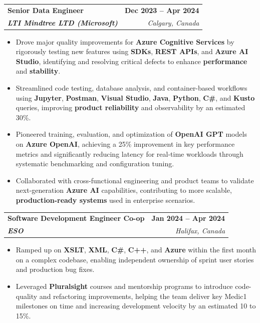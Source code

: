 \documentclass[letterpaper,11pt]{article}
\makeatletter
\newcommand{\resumeItem}[1]{
  \item\small{
    {#1 \vspace{-2pt}}
  }
}
\newcommand{\resumeSubheading}[4]{
  \vspace{-2pt}\item
    \begin{tabular*}{1.0\textwidth}[t]{l@{\extracolsep{\fill}}r}
      \textbf{#1} & \textbf{\small #2} \\
      \textit{\small#3} & \textit{\small #4} \\
    \end{tabular*}\vspace{-7pt}
}
\newcommand{\resumeItemListStart}{\begin{itemize}}
\newcommand{\resumeItemListEnd}{\end{itemize}\vspace{-5pt}}
\makeatother
\begin{document}
    \resumeSubheading
      {\textbf{Senior Data Engineer}}{\textbf{Dec 2023 -- Apr 2024}}
      {\textbf{LTI Mindtree LTD (Microsoft)}}{Calgary, Canada}
      \resumeItemListStart
        \resumeItem{Drove major quality improvements for \textbf{Azure Cognitive Services} by rigorously testing new features using \textbf{SDKs}, \textbf{REST APIs}, and \textbf{Azure AI Studio}, identifying and resolving critical defects to enhance \textbf{performance} and \textbf{stability}.}
        \resumeItem{Streamlined code testing, database analysis, and container-based workflows using \textbf{Jupyter}, \textbf{Postman}, \textbf{Visual Studio}, \textbf{Java}, \textbf{Python}, \textbf{C\#}, and \textbf{Kusto} queries, improving \textbf{product reliability} and observability by an estimated 30\%.}
        \resumeItem{Pioneered training, evaluation, and optimization of \textbf{OpenAI GPT} models on \textbf{Azure OpenAI}, achieving a 25\% improvement in key performance metrics and significantly reducing latency for real-time workloads through systematic benchmarking and configuration tuning.}
        \resumeItem{Collaborated with cross-functional engineering and product teams to validate next-generation \textbf{Azure AI} capabilities, contributing to more scalable, \textbf{production-ready systems} used in enterprise scenarios.}
      \resumeItemListEnd
    
    \resumeSubheading
      {\textbf{Software Development Engineer Co-op}}{\textbf{Jan 2024 -- Apr 2024}}
      {\textbf{ESO}}{Halifax, Canada}
      \resumeItemListStart
        \resumeItem{Ramped up on \textbf{XSLT}, \textbf{XML}, \textbf{C\#}, \textbf{C++}, and \textbf{Azure} within the first month on a complex codebase, enabling independent ownership of sprint user stories and production bug fixes.}
        \resumeItem{Leveraged \textbf{Pluralsight} courses and mentorship programs to introduce code-quality and refactoring improvements, helping the team deliver key Medic1 milestones on time and increasing development velocity by an estimated 10 to 15\%.}
      \resumeItemListEnd
\end{document}

